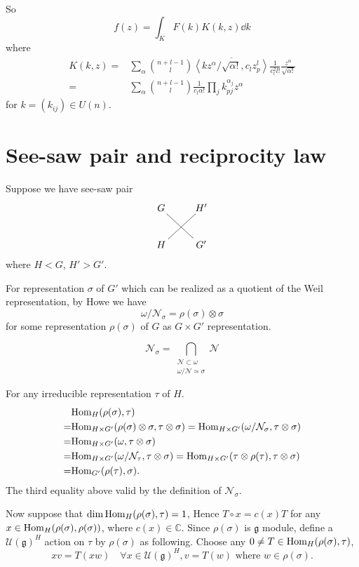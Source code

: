 \documentclass[12pt]{article}
\def\Hom{{\rm Hom}}
\def\bC{{\mathbb{C}}}
\def\inn#1#2{\left\langle{#1},{#2}\right\rangle}
\def\fgg{\mathfrak{g}}
\def\cnn{\mathcal{N}}
\def\cuu{\mathcal{U}}
\begin{document}
So 
\[
f(z) = \int_K F(k) K(k,z) \dd k 
\]
where 
\[
\begin{split}
K(k,z) =& \sum_{\alpha} \binom{n+l-1}{l} 
\overline{\inn{k z^\alpha/\sqrt{\alpha!}}{c_lz_p^l}}\frac{1}{c_l^2l!}
\frac{z^\alpha}{\sqrt{\alpha!}}\\
= & \sum_\alpha \binom{n+l-1}{l}\frac{1}{c_l \alpha!}
\prod_j k_{pj}^{\alpha_j} z^\alpha
\end{split}
\]
for $k = (k_{ij}) \in U(n)$. 

\section{See-saw pair and reciprocity law}
Suppose we have see-saw pair
\[
\xymatrix{G \ar@{-}[dr] & H'\\
H\ar@{-}[ur] & G'
}
\]
where $H < G$, $H'> G'$. 

For representation $\sigma$ of $G'$ which can be realized as a quotient of
the Weil representation, by Howe we have
\[
 \omega/\cnn_\sigma= \rho(\sigma)\otimes \sigma
\]
for some representation $\rho(\sigma)$ of $G$ as $G\times G'$ representation.

\[
\cnn_\sigma = \bigcap_{\substack{\cnn\subset \omega\\ \omega/\cnn\simeq \sigma}}\cnn
\]

For any irreducible representation $\tau$ of $H$.
\[
\begin{split}
&\Hom_{H}(\rho(\sigma), \tau)\\
= & \Hom_{H\times G'}(\rho(\sigma)\otimes \sigma, \tau\otimes \sigma)
=  \Hom_{H\times G'}(\omega/\cnn_\sigma, \tau\otimes \sigma)\\
= & \Hom_{H\times G'}(\omega, \tau\otimes \sigma)\\
= & \Hom_{H\times G'}(\omega/\cnn_\tau, \tau\otimes \sigma)
= \Hom_{H\times G'}(\tau\otimes \rho(\tau), \tau\otimes \sigma)\\
= & \Hom_{G'}(\rho(\tau), \sigma).
\end{split}
\]
The third equality above valid by the definition of $\cnn_\sigma$. 


Now suppose that $\dim \Hom_{H}(\rho(\sigma),\tau)=1$,
Hence $T\circ x = c(x) T$ for any $x\in \Hom_{H}(\rho(\sigma),\rho(\sigma))$, where $c(x)\in \bC$.
Since $\rho(\sigma)$ is $\fgg$ module, define a $\cuu(\fgg)^H$ action 
on $\tau$ by $\rho(\sigma)$ as following.
Choose any $0 \neq T\in \Hom_{H}(\rho(\sigma),\tau)$,
\[
x v = T(x w) \quad  \forall x\in \cuu(\fgg)^H, v=T(w) 
\text{ where } w\in \rho(\sigma).
\] 
\end{document}
